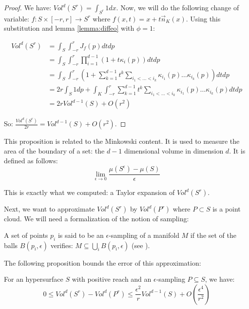 \begin{proof}
    We have: $ Vol^d(S^r) = \int_{S^r} 1 dx $. Now, we will do the following
    change of variable: $ f : S \times [-r, r] \rightarrow S^r $ where $ f(x, t)
    = x + t \vec{n}_K(x) $. Using this substitution and lemma \ref{lemma:diffeo}
    with $ \phi = 1 $:

    \begin{align*}
        Vol^d(S^r) &= \int_S \int_{-r}^r J_f(p) dt dp \\
        &= \int_S \int_{-r}^r \prod_{i=1}^{d-1} (1 + t \kappa_i(p)) dt dp \\
        &= \int_S \int_{-r}^r \left( 1 + \sum_{k=1}^{d-1} t^k \sum_{i_1 < \ldots
                < i_k} \kappa_{i_1}(p) \ldots \kappa_{i_k}(p) \right) dt dp \\
        &= 2r \int_S 1 dp + \int_K \int_{-r}^r \sum_{k=1}^{d-1} t^k \sum_{i_1 < \ldots < i_k} \kappa_{i_1}(p) \ldots \kappa_{i_k}(p) dt dp \\
        &= 2r Vol^{d-1}(S) + O(r^2)
    \end{align*}

    So: $ \frac{Vol^d(S^r)}{2r} = Vol^{d-1}(S) + O(r^2) $.
\end{proof}

This proposition is related to the Minkowski content. It is used to measure the
area of the boundary of a set: the $ d-1 $ dimensional volume in dimension $ d
$. It is defined as follows:
$$ \lim\limits_{\epsilon \to 0} \frac{\mu(S^{\epsilon}) - \mu(S)}{\epsilon} $$

This is exactly what we computed: a Taylor expansion of $ Vol^d(S^r) $.

Next, we want to approximate $ Vol^d(S^r) $ by $ Vol^d(P^r) $ where $ P \subset
S $ is a point cloud. We will need a formalization of the notion of sampling:

\begin{definition}
    A set of points $ p_i $ is said to be an $\epsilon$-sampling of a manifold $
    M $ if the set of the balls  $ B(p_i, \epsilon) $ verifies: $ M \subseteq
    \bigcup_i B(p_i, \epsilon) $ (see \cite{amenta1999surface}).
\end{definition}

The following proposition bounds the error of this approximation:

\begin{proposition}
    \label{prop:comp-vol-offsets}
    For an hypersurface $ S $ with positive reach and an $\epsilon$-sampling $ P
    \subseteq S $, we have:
    $$ 0 \leq Vol^d(S^r) - Vol^d(P^r) \leq \frac{\epsilon^2}{r} Vol^{d-1}(S) +
    O(\frac{\epsilon^4}{r^2}) $$
\end{proposition}


